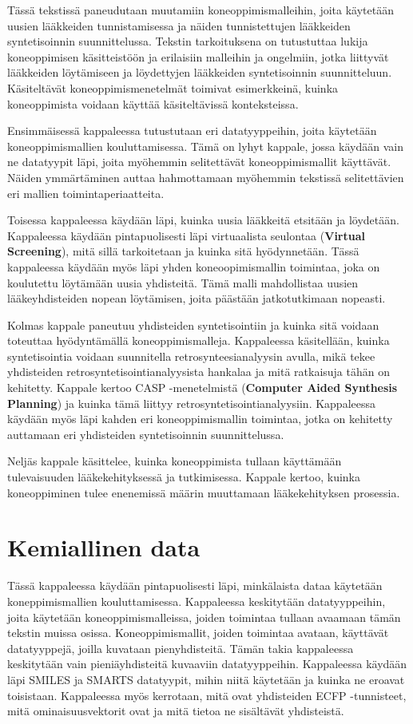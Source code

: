 \documentclass[finnish,twoside,censored,tkt,sw-line]{HYthesisML}
\begin{document}
Tässä tekstissä paneudutaan muutamiin koneoppimismalleihin, joita käytetään uusien lääkkeiden tunnistamisessa ja näiden tunnistettujen lääkkeiden syntetisoinnin suunnittelussa.
Tekstin tarkoituksena on tutustuttaa lukija koneoppimisen käsitteistöön ja erilaisiin malleihin ja ongelmiin, jotka liittyvät lääkkeiden löytämiseen ja löydettyjen lääkkeiden syntetisoinnin suunnitteluun.
Käsiteltävät koneoppimismenetelmät toimivat esimerkkeinä, kuinka koneoppimista voidaan käyttää käsiteltävissä konteksteissa.

Ensimmäisessä kappaleessa tutustutaan eri datatyyppeihin, joita käytetään koneoppimismallien kouluttamisessa.
Tämä on lyhyt kappale, jossa käydään vain ne datatyypit läpi, joita myöhemmin selitettävät koneoppimismallit käyttävät.
Näiden ymmärtäminen auttaa hahmottamaan myöhemmin tekstissä selitettävien eri mallien toimintaperiaatteita.

Toisessa kappaleessa käydään läpi, kuinka uusia lääkkeitä etsitään ja löydetään.
Kappaleessa käydään pintapuolisesti läpi virtuaalista seulontaa (\textbf{Virtual Screening}), mitä sillä tarkoitetaan ja kuinka sitä hyödynnetään.
Tässä kappaleessa käydään myös läpi yhden koneoopimismallin toimintaa, joka on koulutettu löytämään uusia yhdisteitä.
Tämä malli mahdollistaa uusien lääkeyhdisteiden nopean löytämisen, joita päästään jatkotutkimaan nopeasti.

Kolmas kappale paneutuu yhdisteiden syntetisointiin ja kuinka sitä voidaan toteuttaa hyödyntämällä koneoppimismalleja.
Kappaleessa käsitellään, kuinka syntetisointia voidaan suunnitella retrosynteesianalyysin avulla, mikä tekee yhdisteiden retrosyntetisointianalyysista hankalaa ja mitä ratkaisuja tähän on kehitetty.
Kappale kertoo CASP -menetelmistä (\textbf{Computer Aided Synthesis Planning}) ja kuinka tämä liittyy retrosyntetisointianalyysiin.
Kappaleessa käydään myös läpi kahden eri koneoppimismallin toimintaa, jotka on kehitetty auttamaan eri yhdisteiden syntetisoinnin suunnittelussa.

Neljäs kappale käsittelee, kuinka koneoppimista tullaan käyttämään tulevaisuuden lääkekehityksessä ja tutkimisessa.
Kappale kertoo, kuinka koneoppiminen tulee enenemissä määrin muuttamaan lääkekehityksen prosessia.

\chapter{Kemiallinen data}

Tässä kappaleessa käydään pintapuolisesti läpi, minkälaista dataa käytetään koneppimismallien kouluttamisessa.
Kappaleessa keskitytään datatyyppeihin, joita käytetään koneoppimismalleissa, joiden toimintaa tullaan avaamaan tämän tekstin muissa osissa.
Koneoppimismallit, joiden toimintaa avataan, käyttävät datatyyppejä, joilla kuvataan pienyhdisteitä.
Tämän takia kappaleessa keskitytään vain pieniäyhdisteitä kuvaaviin datatyyppeihin.
Kappaleessa käydään läpi SMILES ja SMARTS datatyypit, mihin niitä käytetään ja kuinka ne eroavat toisistaan.
Kappaleessa myös kerrotaan, mitä ovat yhdisteiden ECFP -tunnisteet, mitä ominaisuusvektorit ovat ja mitä tietoa ne sisältävät yhdisteistä.
\end{document}
